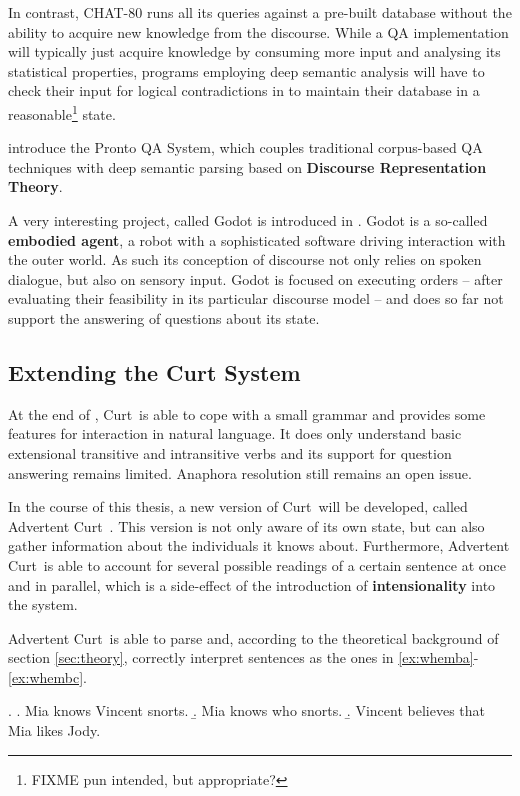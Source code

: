 \documentclass[12pt,a4paper]{article}
\newcommand{\abbr}{\textsf} %
\newcommand{\term}[1]{\textsf{\textbf{#1}}} %
\newcommand{\pn}{\textsf} %
\newcommand{\curt}{\pn{Curt}\mbox{ }}
\newcommand{\acurt}{\pn{Advertent Curt}\mbox{ }}
\theoremstyle{remark} \newtheorem*{termin}{Terminology} %
\begin{document}
In contrast, \pn{CHAT-80} runs all its queries against a pre-built database
without the ability to acquire new knowledge from the discourse. While a
\abbr{QA} implementation will typically just acquire knowledge by consuming
more input and analysing its statistical properties, programs employing deep
semantic analysis will have to check their input for logical contradictions in
to maintain their database in a reasonable\footnote{FIXME pun intended, but
appropriate? %
} state.

\cite{prontoqa} introduce the \pn{Pronto QA System}, which couples traditional
corpus-based \abbr{QA} techniques with deep semantic parsing based on
\term{Discourse Representation Theory}.

A very interesting project, called \pn{Godot} is introduced in \cite{godot}.
\pn{Godot} is a so-called \term{embodied agent}, a robot with a sophisticated
software driving interaction with the outer world. As such its conception of
discourse not only relies on spoken dialogue, but also on sensory input.
\pn{Godot} is focused on executing orders -- after evaluating their feasibility
in its particular discourse model -- and does so far not support the answering
of questions about its state.

\subsection{Extending the Curt System}

At the end of \cite{blackburnbos:cl1}, \curt is able to cope with a small
grammar and provides some features for interaction in natural
language. It does only understand basic extensional transitive and intransitive
verbs and its support for question answering remains limited.
Anaphora resolution still remains an open issue.

In the course of this thesis, a new version of \curt will be developed, called
\acurt. This version is not only aware of its own state, but can also gather
information about the individuals it knows about. Furthermore, \acurt is
able to account for several possible readings of a certain sentence at once and
in parallel, which is a side-effect of the introduction of \term{intensionality}
into the system.

\acurt is able to parse and, according to the theoretical background of section
\ref{sec:theory}, correctly interpret sentences as the ones in
\ref{ex:whemba}-\ref{ex:whembc}.

\ex.
\a.  Mia knows Vincent snorts.\label{ex:whemba}
\b.  Mia knows who snorts.
\b.  Vincent believes that Mia likes Jody.\label{ex:whembc}
\end{document}
